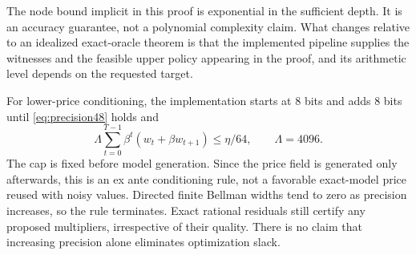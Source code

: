The node bound implicit in this proof is exponential in the sufficient depth. It is an accuracy guarantee, not a polynomial complexity claim. What changes relative to an idealized exact-oracle theorem is that the implemented pipeline supplies the witnesses and the feasible upper policy appearing in the proof, and its arithmetic level depends on the requested target.

For lower-price conditioning, the implementation starts at 8 bits and adds 8 bits until \eqref{eq:precision48} holds and
\begin{equation}\label{eq:pricebudget48}
 \Lambda\sum_{t=0}^{T-1}\beta^t(w_t+\beta w_{t+1})\le\eta/64,
 \qquad \Lambda=4096.
\end{equation}
The cap is fixed before model generation. Since the price field is generated only afterwards, this is an ex ante conditioning rule, not a favorable exact-model price reused with noisy values. Directed finite Bellman widths tend to zero as precision increases, so the rule terminates. Exact rational residuals still certify any proposed multipliers, irrespective of their quality. There is no claim that increasing precision alone eliminates optimization slack.
